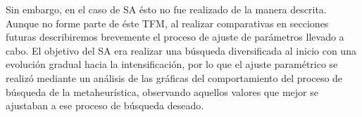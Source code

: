 Sin embargo, en el caso de SA ésto no fue realizado de la manera descrita. Aunque no forme parte de éste TFM, al realizar comparativas en secciones futuras describiremos brevemente el proceso de ajuste de parámetros llevado a cabo.
El objetivo del SA era realizar una búsqueda diversificada al inicio con una evolución gradual hacia la intensificación, por lo que el ajuste paramétrico se realizó mediante un análisis de las gráficas del comportamiento del proceso de búsqueda de la metaheurística, observando aquellos valores que mejor se ajustaban a ese proceso de búsqueda deseado.


